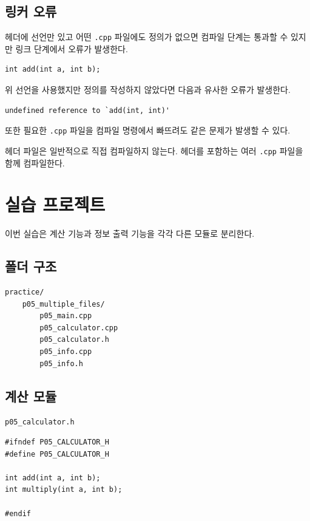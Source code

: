\documentclass[11pt,a4paper]{article}
\begin{document}
\subsection{링커 오류}

헤더에 선언만 있고 어떤 \texttt{.cpp} 파일에도 정의가 없으면 컴파일 단계는 통과할 수 있지만 링크 단계에서 오류가 발생한다.

\begin{lstlisting}
int add(int a, int b);
\end{lstlisting}

위 선언을 사용했지만 정의를 작성하지 않았다면 다음과 유사한 오류가 발생한다.

\begin{verbatim}
undefined reference to `add(int, int)'
\end{verbatim}

또한 필요한 \texttt{.cpp} 파일을 컴파일 명령에서 빠뜨려도 같은 문제가 발생할 수 있다.

\begin{importantbox}
헤더 파일은 일반적으로 직접 컴파일하지 않는다.
헤더를 포함하는 여러 \texttt{.cpp} 파일을 함께 컴파일한다.
\end{importantbox}

\section{실습 프로젝트}

이번 실습은 계산 기능과 정보 출력 기능을 각각 다른 모듈로 분리한다.

\subsection{폴더 구조}

\begin{verbatim}
practice/
    p05_multiple_files/
        p05_main.cpp
        p05_calculator.cpp
        p05_calculator.h
        p05_info.cpp
        p05_info.h
\end{verbatim}

\subsection{계산 모듈}

\texttt{p05\_calculator.h}

\begin{lstlisting}
#ifndef P05_CALCULATOR_H
#define P05_CALCULATOR_H

int add(int a, int b);
int multiply(int a, int b);

#endif
\end{lstlisting}
\end{document}
